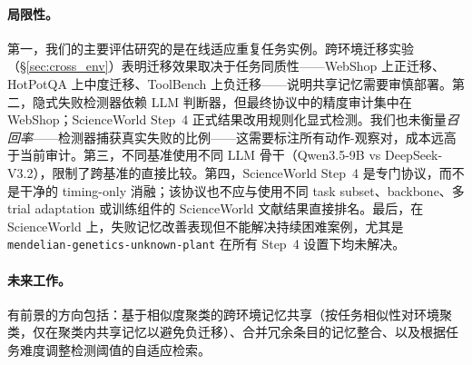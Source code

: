 \documentclass[11pt,a4paper]{article}
\begin{document}
\paragraph{局限性。} 第一，我们的主要评估研究的是在线适应重复任务实例。跨环境迁移实验（\S\ref{sec:cross_env}）表明迁移效果取决于任务同质性——WebShop 上正迁移、HotPotQA 上中度迁移、ToolBench 上负迁移——说明共享记忆需要审慎部署。第二，隐式失败检测器依赖 LLM 判断器，但最终协议中的精度审计集中在 WebShop；ScienceWorld Step~4 正式结果改用规则化显式检测。我们也未衡量\emph{召回率}——检测器捕获真实失败的比例——这需要标注所有动作-观察对，成本远高于当前审计。第三，不同基准使用不同 LLM 骨干（Qwen3.5-9B vs DeepSeek-V3.2），限制了跨基准的直接比较。第四，ScienceWorld Step~4 是专门协议，而不是干净的 timing-only 消融；该协议也不应与使用不同 task subset、backbone、多 trial adaptation 或训练组件的 ScienceWorld 文献结果直接排名。最后，在 ScienceWorld 上，失败记忆改善表现但不能解决持续困难案例，尤其是 \texttt{mendelian-genetics-unknown-plant} 在所有 Step~4 设置下均未解决。

\paragraph{未来工作。} 有前景的方向包括：基于相似度聚类的跨环境记忆共享（按任务相似性对环境聚类，仅在聚类内共享记忆以避免负迁移）、合并冗余条目的记忆整合、以及根据任务难度调整检测阈值的自适应检索。



\end{document}
